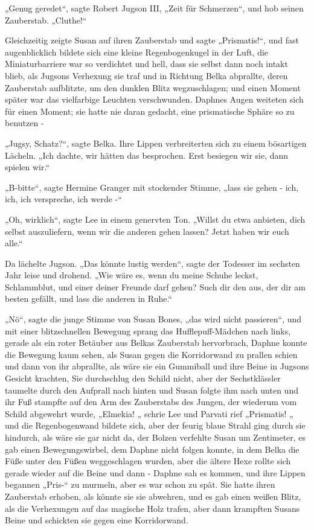 {„Genug geredet“, sagte Robert Jugson III, „Zeit für Schmerzen“, und hob seinen Zauberstab. „Cluthe!“

Gleichzeitig zeigte Susan auf ihren Zauberstab und sagte „Prismatis!“, und fast augenblicklich bildete sich eine kleine Regenbogenkugel in der Luft, die Miniaturbarriere war so verdichtet und hell, dass sie selbst dann noch intakt blieb, als Jugsons Verhexung sie traf und in Richtung Belka abprallte, deren Zauberstab aufblitzte, um den dunklen Blitz wegzuschlagen; und einen Moment später war das vielfarbige Leuchten verschwunden. Daphnes Augen weiteten sich für einen Moment; sie hatte nie daran gedacht, eine prismatische Sphäre so zu benutzen -

„Jugsy, Schatz?“, sagte Belka. Ihre Lippen verbreiterten sich zu einem bösartigen Lächeln. „Ich dachte, wir hätten das besprochen. Erst besiegen wir sie, dann spielen wir.“

„B-bitte“, sagte Hermine Granger mit stockender Stimme, „lass sie gehen - ich, ich, ich verspreche, ich werde -“

„Oh, wirklich“, sagte Lee in einem genervten Ton. „Willst du etwa anbieten, dich selbst auszuliefern, wenn wir die anderen gehen lassen? Jetzt haben wir euch alle.“

Da lächelte Jugson. „Das könnte lustig werden“, sagte der Todesser im sechsten Jahr leise und drohend. „Wie wäre es, wenn du meine Schuhe leckst, Schlammblut, und einer deiner Freunde darf gehen? Such dir den aus, der dir am besten gefällt, und lass die anderen in Ruhe.“

„Nö“, sagte die junge Stimme von Susan Bones, „das wird nicht passieren“, und mit einer blitzschnellen Bewegung sprang das Hufflepuff-Mädchen nach links, gerade als ein roter Betäuber aus Belkas Zauberstab hervorbrach, Daphne konnte die Bewegung kaum sehen, als Susan gegen die Korridorwand zu prallen schien und dann von ihr abprallte, als wäre sie ein Gummiball und ihre Beine in Jugsons Gesicht krachten, Sie durchschlug den Schild nicht, aber der Sechstklässler taumelte durch den Aufprall nach hinten und Susan folgte ihm nach unten und ihr Fuß stampfte auf den Arm des Zauberstabs des Jungen, der wiederum vom Schild abgewehrt wurde, „Elmekia! „ schrie Lee und Parvati rief „Prismatis! „ und die Regenbogenwand bildete sich, aber der feurig blaue Strahl ging durch sie hindurch, als wäre sie gar nicht da, der Bolzen verfehlte Susan um Zentimeter, es gab einen Bewegungswirbel, dem Daphne nicht folgen konnte, in dem Belka die Füße unter den Füßen weggeschlagen wurden, aber die ältere Hexe rollte sich gerade wieder auf die Beine und dann - Daphne sah es kommen, und ihre Lippen begannen „Pris-“ zu murmeln, aber es war schon zu spät. Sie hatte ihren Zauberstab erhoben, als könnte sie sie abwehren, und es gab einen weißen Blitz, als die Verhexungen auf das magische Holz trafen, aber dann krampften Susans Beine und schickten sie gegen eine Korridorwand.

}
